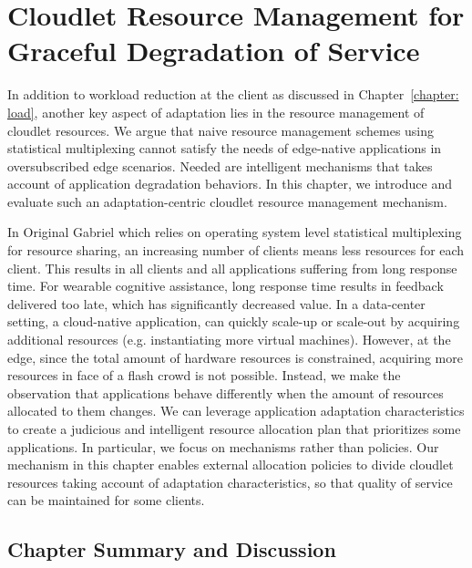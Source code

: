 \chapter{Cloudlet Resource Management for Graceful Degradation of Service}
\label{chapter: cloudlet}

In addition to workload reduction at the client as discussed in
Chapter~\ref{chapter: load}, another key aspect of adaptation lies in the
resource management of cloudlet resources. We argue that naive resource
management schemes using statistical multiplexing cannot satisfy the needs of
edge-native applications in oversubscribed edge scenarios. Needed are
intelligent mechanisms that takes account of application degradation behaviors.
In this chapter, we introduce and evaluate such an adaptation-centric cloudlet
resource management mechanism.

In Original Gabriel which relies on operating system level statistical
multiplexing for resource sharing, an increasing number of clients means less
resources for each client. This results in all clients and all applications
suffering from long response time. For wearable cognitive assistance, long
response time results in feedback delivered too late, which has significantly
decreased value. In a data-center setting, a cloud-native application, can
quickly scale-up or scale-out by acquiring additional resources (e.g.
instantiating more virtual machines). However, at the edge, since the total
amount of hardware resources is constrained, acquiring more resources in face of
a flash crowd is not possible. Instead, we make the observation that
applications behave differently when the amount of resources allocated to them
changes. We can leverage application adaptation characteristics to create a
judicious and intelligent resource allocation plan that prioritizes some
applications. In particular, we focus on mechanisms rather than policies. Our
mechanism in this chapter enables external allocation policies to divide
cloudlet resources taking account of adaptation characteristics, so that quality
of service can be maintained for some clients.








\section{Chapter Summary and Discussion}
\label{cloudlet: summary}

